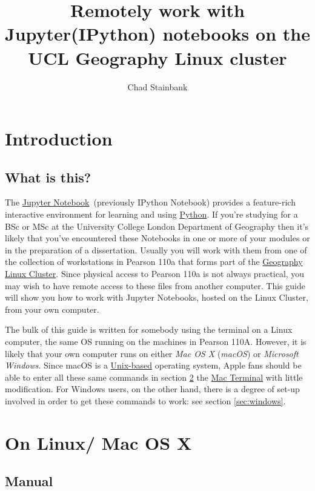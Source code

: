 \documentclass[a4paper]{article}
\title{Remotely work with Jupyter(IPython) notebooks on the UCL Geography Linux cluster}
\author{Chad Stainbank}
\begin{document}
\maketitle
\section{Introduction}
\subsection{What is this?}

The \href{http://jupyter.org/}{Jupyter Notebook}~(previously IPython Notebook) provides a feature-rich interactive environment for learning and using \href{https://www.python.org/}{Python}.
If you're studying for a BSc or MSc at the University College London Department of Geography then it's likely that you've encountered these Notebooks in one or more of your modules or in the preparation of a dissertation.
Usually you will work with them from one of the collection of workstations in Pearson 110a that forms part of the \href{http://www.geog.ucl.ac.uk/resources/computer-support/teaching-cluster}{Geography Linux Cluster}.
Since physical access to Pearson 110a is not always practical, you may wish to have remote access to these files from another computer.
This guide will show you how to work with Jupyter Notebooks, hosted on the Linux Cluster, from your own computer. 

The bulk of this guide is written for somebody using the terminal on a Linux computer, the same OS running on the machines in Pearson 110A.
However, it is likely that your own computer runs on either \emph{Mac OS X} (\emph{macOS}) or \emph{Microsoft Windows}.
Since macOS is a \href{http://unix.stackexchange.com/questions/1489/is-mac-os-x-unix}{Unix-based} operating system, Apple fans should be able to enter all these same commands in section \ref{sec:linuxmac} the \href{http://www.macworld.co.uk/feature/mac-software/get-more-out-of-os-x-terminal-3608274/}{Mac Terminal} with little modification.
For Windows users, on the other hand, there is a degree of set-up involved in order to get these commands to work: see section \ref{sec:windows}.

\section{On Linux/ Mac OS X}
\label{sec:linuxmac}
\subsection{Manual}
\label{sec:manual}
\end{document}
